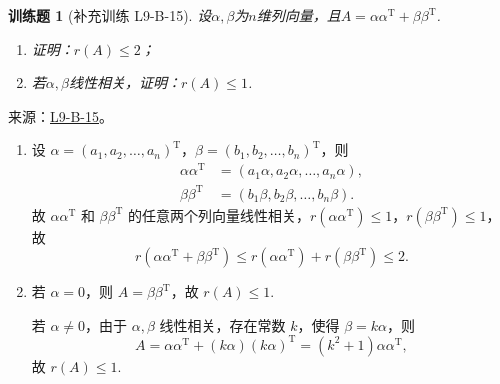 \documentclass[12pt,fontset=fandol]{ctexart}
\newtheorem{exercise}{训练题}[section]
\begin{document}
\begin{exercise}[补充训练 L9-B-15]\label{prob:L9-B-15}
设$\alpha,\beta$为$n$维列向量，且$A=\alpha\alpha^\mathrm{T}+\beta\beta^\mathrm{T}$.
        \begin{enumerate}
            \item 证明：$r(A) \leqslant 2$；

            \item 若$\alpha,\beta$线性相关，证明：$r(A) \leqslant 1$.
        \end{enumerate}
\end{exercise}
\noindent 来源：\href{https://github.com/yhwu-is/Linear-Algebra-Left-Undone/blob/new/%E8%AE%B2%E4%B9%89/%E4%B8%93%E9%A2%98/9%20%E7%9F%A9%E9%98%B5%E8%BF%90%E7%AE%97%E8%BF%9B%E9%98%B6.tex}{L9-B-15}。
\begin{solve}
\begin{enumerate}
                \item 设 $\alpha = (a_1, a_2, \ldots, a_n)^\mathrm{T}$，$\beta = (b_1, b_2, \ldots, b_n)^\mathrm{T}$，则
                    \begin{align*}
                        \alpha \alpha^\mathrm{T} &= (a_1 \alpha, a_2 \alpha, \ldots, a_n \alpha), \\
                        \beta \beta^\mathrm{T} &= (b_1 \beta, b_2 \beta, \ldots, b_n \beta).
                    \end{align*}
                    故 $\alpha \alpha^\mathrm{T}$ 和 $\beta \beta^\mathrm{T}$ 的任意两个列向量线性相关，$r\left(\alpha \alpha^\mathrm{T}\right) \leqslant 1$，$r\left(\beta \beta^\mathrm{T}\right) \leqslant 1$，故
                    \[
                        r\left(\alpha \alpha^\mathrm{T} + \beta \beta^\mathrm{T}\right) \leqslant r\left(\alpha \alpha^\mathrm{T}\right) + r\left(\beta \beta^\mathrm{T}\right) \leqslant 2.
                    \]

                \item 若 $\alpha = 0$，则 $A = \beta \beta^\mathrm{T}$，故 $r(A) \leqslant 1$.

                    若 $\alpha \neq 0$，由于 $\alpha, \beta$ 线性相关，存在常数 $k$，使得 $\beta = k \alpha$，则
                    \[
                        A = \alpha \alpha^\mathrm{T} + (k \alpha)(k \alpha)^\mathrm{T} = (k^2 + 1) \alpha \alpha^\mathrm{T},
                    \]
                    故 $r(A) \leqslant 1$.
            \end{enumerate}
\end{solve}
\end{document}
